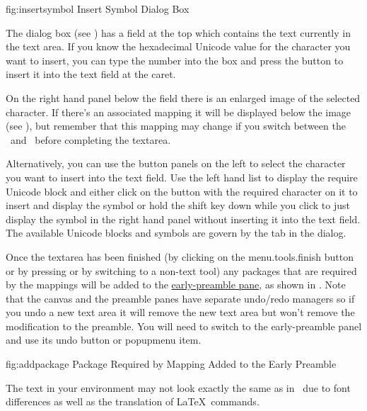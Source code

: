 \FloatFig
  {fig:insertsymbol}
  {}
  {Insert Symbol Dialog Box}

The  dialog box (see )
has a field at the top which contains the text currently in the text
area. If you know the hexadecimal Unicode value for the character
you want to insert, you can type the number into the
 box and press the
  button to
insert it into the text field at the caret. 

On the right hand panel below the  field
there is an enlarged image of the selected character. If there's an
associated mapping it will be displayed below the image
(see ), but remember that this mapping
may change if you switch between the \texttool\ and \mathstool\ before
completing the \gls{textarea}.

Alternatively, you can use the button panels on the left to
select the character you want to insert into the text field. Use the
left hand list to display the require Unicode block and either click
on the button with the required character on it to insert and
display the symbol or hold the shift key down while you click to
just display the symbol in the right hand panel without inserting it
into the text field. The available Unicode blocks and symbols are govern by the
 tab in the  dialog.

Once the \gls{textarea} has been finished (by clicking on the
\gls{menu.tools.finish} button or by pressing
 or by switching to a non-text
tool) any packages that are required by the mappings will be added
to the \hyperref[sec:preamble]{early-preamble pane}, as shown in
.  Note that the \gls{canvas} and the
preamble panes have separate undo\slash redo managers so if you undo
a new text area it will remove the new text area but won't remove
the modification to the preamble. You will need to switch to the
early-preamble panel and use its undo button or \gls{popupmenu} item.

\FloatFig
  {fig:addpackage}
  {}
  {Package Required by Mapping Added to the Early Preamble}

\begin{important}
The text in your  environment may not
look exactly the same as in \FlowframTk\ due to font differences as
well as the translation of \LaTeX\ commands.
\end{important}

